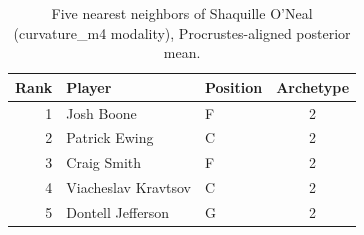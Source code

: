 \begin{table}[htbp]
  \centering\small
  \begin{tabular}{rllc}
    \toprule
    Rank & Player & Position & Archetype \\
    \midrule
    1 & Josh Boone & F & 2 \\
    2 & Patrick Ewing & C & 2 \\
    3 & Craig Smith & F & 2 \\
    4 & Viacheslav Kravtsov & C & 2 \\
    5 & Dontell Jefferson & G & 2 \\
    \bottomrule
  \end{tabular}
  \caption{Five nearest neighbors of Shaquille O'Neal (curvature_m4 modality), Procrustes-aligned posterior mean.}
  \label{tab:Shaquille_O_Neal_neighbors_curvature_m4}
\end{table}

